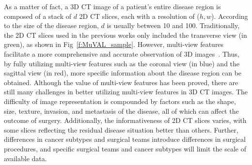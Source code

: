 As a matter of fact, a 3D CT image of a patient's entire disease region is composed of a stack of $d$ 2D CT slices, each with a resolution of ($h, w$). 
According to the size of the disease region, $d$ is usually between 10 and 100.
Traditionally, the 2D CT slices used in the previous works only included the transverse view (in green), as shown in Fig~\ref{f:MuVAL_sample}.
However, multi-view features facilitate a more comprehensive and accurate observation of 3D images~\cite{wildeman20092d, wu2020deep}.
Thus, by fully utilizing multi-view features such as the coronal view (in blue) and the sagittal view (in red), more specific information about the disease region can be obtained. 
Although the value of multi-view features has been proved, there are still many challenges in better utilizing multi-view features in 3D CT images. 
The difficulty of image representation is compounded by factors such as the shape, size, texture, invasion, and metastasis of the disease, all of which can affect the outcome of surgery. Additionally, the informativeness of 2D CT slices varies, with some slices reflecting the residual disease situation better than others. 
Further, differences in cancer subtypes and surgical teams introduce differences in surgical procedures, and specific surgical teams and cancer subtypes will limit the scale of available data.


